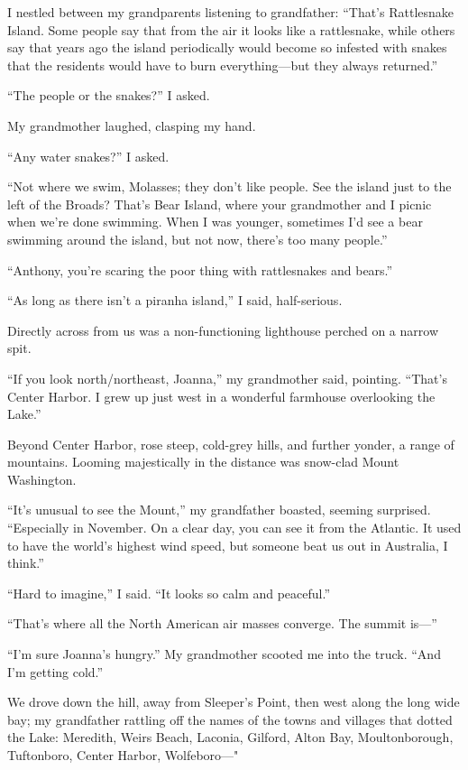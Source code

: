 I nestled between my grandparents listening to grandfather: ``That's
Rattlesnake Island. Some people say that from the air it looks like a
rattlesnake, while others say that years ago the island periodically
would become so infested with snakes that the residents would have to
burn everything---but they always returned.''

``The people or the snakes?'' I asked.

My grandmother laughed, clasping my hand.

``Any water snakes?'' I asked.

``Not where we swim, Molasses; they don't like people. See the island
just to the left of the Broads? That's Bear Island, where your
grandmother and I picnic when we're done swimming. When I was younger,
sometimes I'd see a bear swimming around the island, but not now,
there's too many people.''

``Anthony, you're scaring the poor thing with rattlesnakes and bears.''

``As long as there isn't a piranha island,'' I said, half-serious.

Directly across from us was a non-functioning lighthouse perched on a
narrow spit.

``If you look north/northeast, Joanna,'' my grandmother said, pointing.
``That's Center Harbor. I grew up just west in a wonderful farmhouse
overlooking the Lake.''

Beyond Center Harbor, rose steep, cold-grey hills, and further yonder, a
range of mountains. Looming majestically in the distance was snow-clad
Mount Washington.

``It's unusual to see the Mount,'' my grandfather boasted, seeming
surprised. ``Especially in November. On a clear day, you can see it from
the Atlantic. It used to have the world's highest wind speed, but
someone beat us out in Australia, I think.''

``Hard to imagine,'' I said. ``It looks so calm and peaceful.''

``That's where all the North American air masses converge. The summit
is---''

``I'm sure Joanna's hungry.'' My grandmother scooted me into the truck.
``And I'm getting cold.''

We drove down the hill, away from Sleeper's Point, then west along the
long wide bay; my grandfather rattling off the names of the towns and
villages that dotted the Lake: Meredith, Weirs Beach, Laconia, Gilford,
Alton Bay, Moultonborough, Tuftonboro, Center Harbor, Wolfeboro---"

